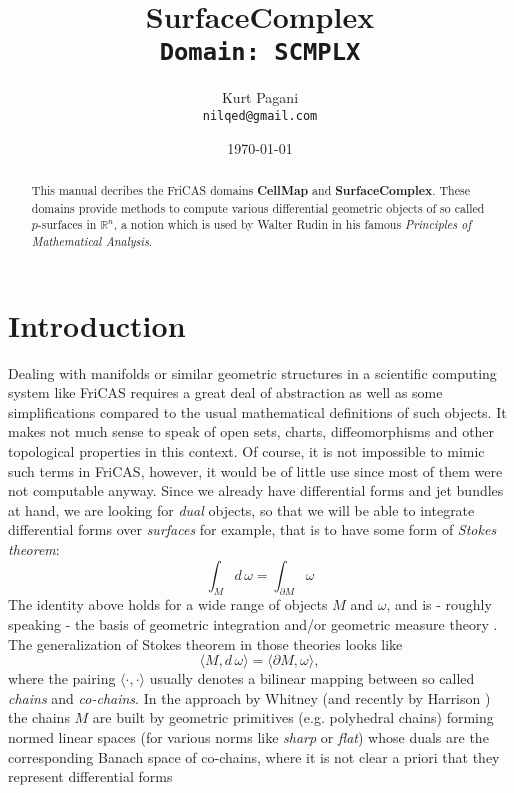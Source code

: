 \documentclass[12pt,a4paper]{article}
\author{Kurt Pagani \\ {\tt nilqed@gmail.com}}
\date{\today}
\title{SurfaceComplex \\ {\small\tt Domain: SCMPLX}}
\newcommand{\RR}[1]{\mathbb{R}^{#1}}
\begin{document}
\maketitle
%
\begin{abstract}
This manual decribes the FriCAS domains {\bf CellMap} and 
{\bf SurfaceComplex}. These domains provide methods to compute
various differential geometric objects of so called $p$-surfaces
in ${\RR n}$, a notion which is used by Walter Rudin in his famous
{\it Principles of Mathematical Analysis}. 
\end{abstract}
%
\section{Introduction}
%
Dealing with manifolds or similar geometric structures in a scientific
computing system like FriCAS requires a great deal of abstraction as well
as some simplifications compared to the usual mathematical definitions of
such objects. It makes not much sense to speak of open sets, charts,
diffeomorphisms and other topological properties in this context. Of 
course, it is not impossible to mimic such terms in FriCAS, however,
it would be of little use since most of them were not computable
anyway. Since we already have differential forms and jet bundles at
hand, we are looking for {\it dual} objects, so that we will be able
to integrate differential forms over {\it surfaces} for example, that
is to have some form of {\em Stokes theorem}:
\begin{displaymath}
  \int_{M} d\,\omega = \int_{\partial M} \omega
\end{displaymath}   
The identity above holds for a wide range of objects $M$ and $\omega$,
and is - roughly speaking - the basis of geometric integration 
\cite{GIT} and/or geometric measure theory \cite{GMT}. The generalization
of Stokes theorem in those theories looks like
\begin{displaymath}
    \langle M,d\, \omega\rangle = \langle \partial M, \omega \rangle,
\end{displaymath}  
where the pairing $\langle\cdot,\cdot\rangle$ usually denotes a bilinear
mapping between so called {\em chains} and {\em co-chains}. In the 
approach \cite{GIT} by Whitney (and recently by Harrison \cite{JH}) the
chains $M$ are built by geometric primitives (e.g. polyhedral chains)
forming normed linear spaces (for various norms like {\em sharp} or
{\em flat}) whose duals are the corresponding Banach space of co-chains,
where it is not clear a priori that they represent differential forms 
\end{document}
